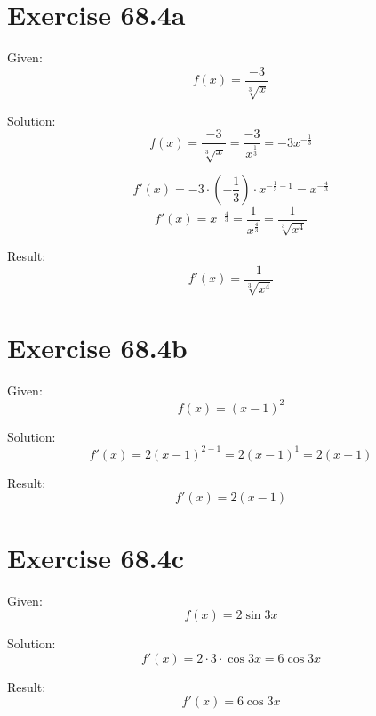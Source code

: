 \documentclass[a4paper, 10pt]{scrartcl}
\begin{document}
\section{Exercise 68.4a}

Given:
\[f(x) = \frac{-3}{\sqrt[3]{x}}\]

Solution:
\[f(x) = \frac{-3}{\sqrt[3]{x}} = \frac{-3}{x^{\frac{1}{3}}} = -3x^{-\frac{1}{3}}\]

\[f'(x) = -3\cdot(-\frac{1}{3})\cdot x^{-\frac{1}{3} - 1} = x^{-\frac{4}{3}}\]
\[f'(x) = x^{-\frac{4}{3}} = \frac{1}{x^{\frac{4}{3}}} = \frac{1}{\sqrt[3]{x^{4}}}\]

Result:
\[f'(x) = \frac{1}{\sqrt[3]{x^{4}}}\]

\section{Exercise 68.4b}

Given:
\[f(x) = (x - 1)^{2}\]

Solution:
\[f'(x) = 2(x - 1)^{2 - 1} = 2(x - 1)^{1} = 2(x - 1)\]

Result:
\[f'(x) = 2(x - 1)\]

\section{Exercise 68.4c}

Given:
\[f(x) = 2\sin{3x}\]

Solution:
\[f'(x) = 2\cdot3\cdot \cos{3x} = 6\cos{3x}\]

Result:
\[f'(x) = 6\cos{3x}\]
\end{document}
